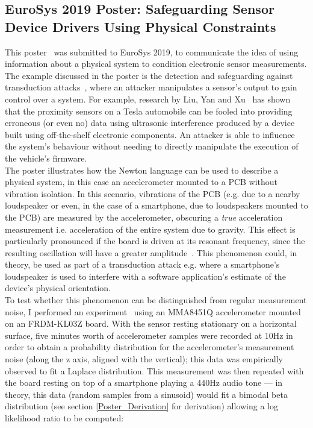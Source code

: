 \documentclass[12pt]{article}
\begin{document}
\begin{appendix}
    \newpage


  \section{EuroSys 2019 Poster: Safeguarding Sensor Device Drivers Using Physical Constraints} \label{poster_appendix}
    This poster~\cite{eurosys_poster} was submitted to EuroSys 2019, to communicate the idea of using information about a physical system to condition electronic sensor measurements. The example discussed in the poster is the detection and safeguarding against transduction attacks~\cite{Fu_2018}, where an attacker manipulates a sensor's output to gain control over a system. For example, research by Liu, Yan and Xu~\cite{autonomous_vehicles} has shown that the proximity sensors on a Tesla automobile can be fooled into providing erroneous (or even no) data using ultrasonic interference produced by a device built using off-the-shelf electronic components. An attacker is able to influence the system's behaviour without needing to directly manipulate the execution of the vehicle's firmware.\\

    The poster illustrates how the Newton language can be used to describe a physical system, in this case an accelerometer mounted to a PCB without vibration isolation. In this scenario, vibrations of the PCB (e.g. due to a nearby loudspeaker or even, in the case of a smartphone, due to loudspeakers mounted to the PCB) are measured by the accelerometer, obscuring a \textit{true} acceleration measurement i.e. acceleration of the entire system due to gravity. This effect is particularly pronounced if the board is driven at its resonant frequency, since the resulting oscillation will have a greater amplitude~\cite{adi}. This phenomenon could, in theory, be used as part of a transduction attack e.g. where a smartphone's loudspeaker is used to interfere with a software application's estimate of the device's physical orientation.\\

    To test whether this phenomenon can be distinguished from regular measurement noise, I performed an experiment~\cite{poster_experiment} using an MMA8451Q accelerometer mounted on an FRDM-KL03Z board. With the sensor resting stationary on a horizontal surface, five minutes worth of accelerometer samples were recorded at 10Hz in order to obtain a probability distribution for the accelerometer's measurement noise (along the z axis, aligned with the vertical); this data was empirically observed to fit a Laplace distribution. This measurement was then repeated with the board resting on top of a smartphone playing a 440Hz audio tone --- in theory, this data (random samples from a sinusoid) would fit a bimodal beta distribution (see section \ref{Poster_Derivation} for derivation) allowing a log likelihood ratio to be computed:


\end{appendix}
\end{document}
